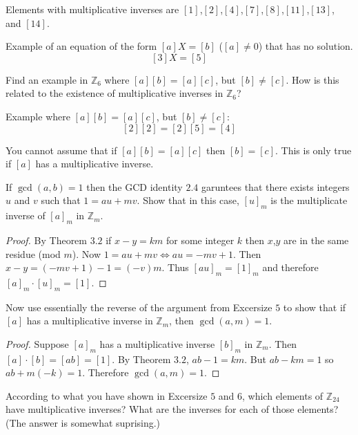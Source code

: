 Elements with multiplicative inverses are $[1]$,$[2]$,$[4]$,$[7]$,$[8]$,$[11]$,$[13]$, and $[14]$.

Example of an equation of the form $[a]X = [b]$ ($[a] \not = 0$)
    that has no solution.
\[[3]X = [5]\]

\begin{tcolorbox}[title=Problem 4, breakable]
    Find an example in $\mathbb{Z}_6$ where $[a][b] = [a][c]$, but $[b] \not = [c]$.
    How is this related to the existence of  multiplicative inverses in $\mathbb{Z}_6$?
\end{tcolorbox}

Example where $[a][b] = [a][c]$, but $[b] \not = [c]$:
\[[2][2] = [2][5] = [4]\]

You cannot assume that if  $[a][b] = [a][c]$ then $[b] = [c]$.
This is only true if $[a]$ has a multiplicative inverse.

\begin{tcolorbox}[title=Problem 5, breakable]
    If $\gcd(a, b) = 1$ then the GCD identity $2.4$ garuntees that there exists 
    integers $u$ and $v$ such that $1 = au + mv$. Show that in this case, 
    $[u]_m$ is the multiplicate inverse of $[a]_m$ in $\mathbb{Z}_m$.
\end{tcolorbox}

\begin{proof}
    By Theorem $3.2$ if $x - y = km$ for some integer $k$ then $x$,$y$ are in the same residue (mod $m$).
    Now $1 = au + mv \iff au = -mv + 1$.
    Then $x - y = (-mv + 1) - 1 = (-v)m$.
    Thus ${[au]}_m = {[1]}_m$ and therefore $[a]_m \cdot [u]_m = [1]$.
\end{proof}

\begin{tcolorbox}[title=Problem 6, breakable]
    Now use essentially the reverse of the argument from Excersize $5$
    to show that if $[a]$ has a multiplicative inverse in $\mathbb{Z}_m$,
    then $\gcd(a, m) = 1$.
\end{tcolorbox}

\begin{proof}
    Suppose $[a]_m$ has a multiplicative inverse $[b]_m$ in $\mathbb{Z}_m$.
    Then $[a] \cdot [b] = [ab] = [1]$.
    By Theorem $3.2$, $ab - 1 = km$.
    But $ab - km = 1$ so $ab + m(-k) = 1$.
    Therefore $\gcd(a, m) = 1$.
\end{proof}

\begin{tcolorbox}[title=Problem 7, breakable]
    According to what you have shown in Excersize $5$ and $6$, which 
    elements of $\mathbb{Z}_{24}$ have multiplicative inverses?
    What are the inverses for each of those elements? (The answer is somewhat suprising.)
\end{tcolorbox}

